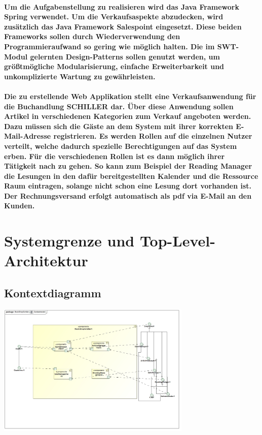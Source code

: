 \documentclass[a4paper]{article}
\begin{document}
\paragraph{Um die Aufgabenstellung zu realisieren wird das Java Framework Spring verwendet. Um die Verkaufsaspekte abzudecken, wird zusätzlich das Java Framework Salespoint eingesetzt. Diese beiden Frameworks sollen durch Wiederverwendung den Programmieraufwand so gering wie möglich halten. Die im SWT-Modul gelernten Design-Patterns sollen genutzt werden, um größtmögliche Modularisierung, einfache Erweiterbarkeit und unkomplizierte Wartung zu gewährleisten.}

\paragraph{Die zu erstellende Web Applikation stellt eine Verkaufsanwendung für die Buchandlung SCHILLER dar. Über diese Anwendung sollen Artikel in verschiedenen Kategorien zum Verkauf angeboten werden. Dazu müssen sich die Gäste an dem System mit ihrer korrekten E-Mail-Adresse registrieren. Es werden Rollen auf die einzelnen Nutzer verteilt, welche dadurch spezielle Berechtigungen auf das System erben. Für die verschiedenen Rollen ist es dann möglich ihrer Tätigkeit nach zu gehen. So kann zum Beispiel der Reading Manager die Lesungen in den dafür bereitgestellten Kalender und die Ressource Raum eintragen, solange nicht schon eine Lesung dort vorhanden ist. Der Rechnungsversand erfolgt automatisch als pdf via E-Mail an den Kunden.}

\section{Systemgrenze und Top-Level-Architektur}

\subsection{Kontextdiagramm}

\includegraphics[width=350px]{kontextmodell.jpg}
\end{document}
